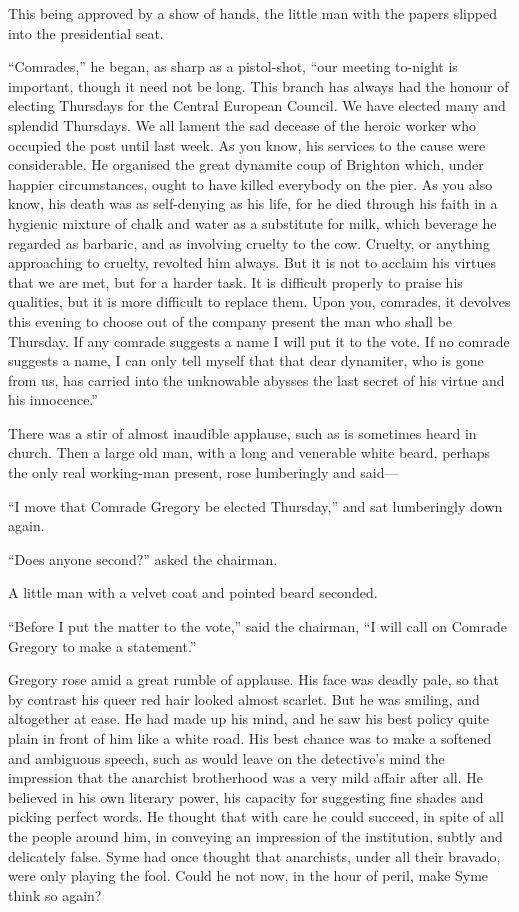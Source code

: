 \documentclass{book}
\begin{document}
This being approved by a show of hands, the little man with the papers slipped into the presidential seat.

“Comrades,” he began, as sharp as a pistol-shot, “our meeting to-night is important, though it need not be long. This branch has always had the honour of electing Thursdays for the Central European Council. We have elected many and splendid Thursdays. We all lament the sad decease of the heroic worker who occupied the post until last week. As you know, his services to the cause were considerable. He organised the great dynamite coup of Brighton which, under happier circumstances, ought to have killed everybody on the pier. As you also know, his death was as self-denying as his life, for he died through his faith in a hygienic mixture of chalk and water as a substitute for milk, which beverage he regarded as barbaric, and as involving cruelty to the cow. Cruelty, or anything approaching to cruelty, revolted him always. But it is not to acclaim his virtues that we are met, but for a harder task. It is difficult properly to praise his qualities, but it is more difficult to replace them. Upon you, comrades, it devolves this evening to choose out of the company present the man who shall be Thursday. If any comrade suggests a name I will put it to the vote. If no comrade suggests a name, I can only tell myself that that dear dynamiter, who is gone from us, has carried into the unknowable abysses the last secret of his virtue and his innocence.”

There was a stir of almost inaudible applause, such as is sometimes heard in church. Then a large old man, with a long and venerable white beard, perhaps the only real working-man present, rose lumberingly and said—

“I move that Comrade Gregory be elected Thursday,” and sat lumberingly down again.

“Does anyone second?” asked the chairman.

A little man with a velvet coat and pointed beard seconded.

“Before I put the matter to the vote,” said the chairman, “I will call on Comrade Gregory to make a statement.”

Gregory rose amid a great rumble of applause. His face was deadly pale, so that by contrast his queer red hair looked almost scarlet. But he was smiling, and altogether at ease. He had made up his mind, and he saw his best policy quite plain in front of him like a white road. His best chance was to make a softened and ambiguous speech, such as would leave on the detective’s mind the impression that the anarchist brotherhood was a very mild affair after all. He believed in his own literary power, his capacity for suggesting fine shades and picking perfect words. He thought that with care he could succeed, in spite of all the people around him, in conveying an impression of the institution, subtly and delicately false. Syme had once thought that anarchists, under all their bravado, were only playing the fool. Could he not now, in the hour of peril, make Syme think so again?
\end{document}
